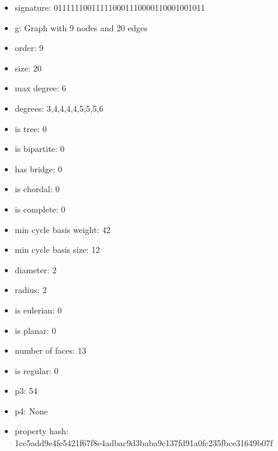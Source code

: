 \newpage
\begin{figure}
\end{figure}
\begin{itemize}
\item signature: 011111100111110001110000110001001011
\item g: Graph with 9 nodes and 20 edges
\item order: 9
\item size: 20
\item max degree: 6
\item degrees: 3,4,4,4,4,5,5,5,6
\item is tree: 0
\item is bipartite: 0
\item has bridge: 0
\item is chordal: 0
\item is complete: 0
\item min cycle basis weight: 42
\item min cycle basis size: 12
\item diameter: 2
\item radius: 2
\item is eulerian: 0
\item is planar: 0
\item number of faces: 13
\item is regular: 0
\item p3: 54
\item p4: None
\item property hash: 1ce5add9e4fe5421f67f8e4adbac9d3baba9c137fd91a0fc235fbce31649b07f
\end{itemize}
